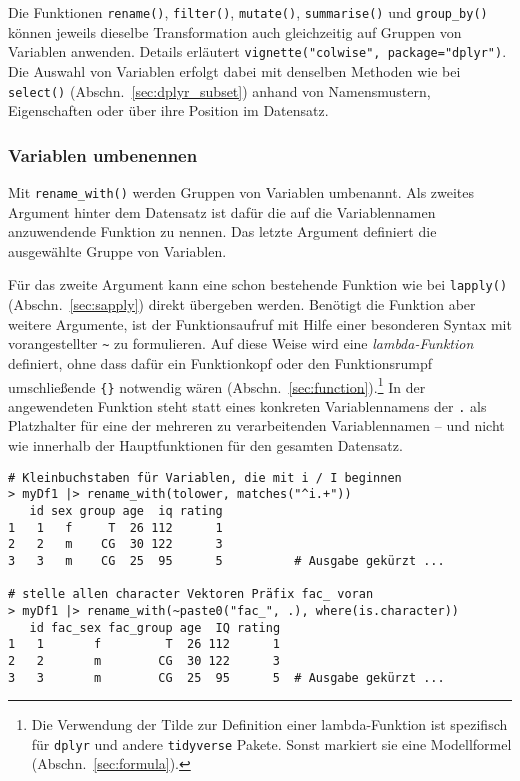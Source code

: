 Die Funktionen \lstinline!rename()!, \lstinline!filter()!, \lstinline!mutate()!, \lstinline!summarise()! und \lstinline!group_by()! können jeweils dieselbe Transformation auch gleichzeitig auf Gruppen von Variablen anwenden. Details erläutert \lstinline!vignette("colwise", package="dplyr")!. Die Auswahl von Variablen erfolgt dabei mit denselben Methoden wie bei \lstinline!select()! (Abschn.\ \ref{sec:dplyr_subset}) anhand von Namensmustern, Eigenschaften oder über ihre Position im Datensatz.

\subsubsection{Variablen umbenennen}

Mit \lstinline!rename_with()! werden Gruppen von Variablen umbenannt. Als zweites Argument hinter dem Datensatz ist dafür die auf die Variablennamen anzuwendende Funktion zu nennen. Das letzte Argument definiert die ausgewählte Gruppe von Variablen.

Für das zweite Argument kann eine schon bestehende Funktion wie bei \lstinline!lapply()! (Abschn.\ \ref{sec:sapply}) direkt übergeben werden. Benötigt die Funktion aber weitere Argumente, ist der Funktionsaufruf mit Hilfe einer besonderen Syntax mit vorangestellter \lstinline!~! zu formulieren. Auf diese Weise wird eine \emph{lambda-Funktion} definiert, ohne dass dafür ein Funktionkopf oder den Funktionsrumpf umschließende \lstinline!{}! notwendig wären (Abschn.\ \ref{sec:function}).\footnote{Die Verwendung der Tilde zur Definition einer lambda-Funktion ist spezifisch für \lstinline!dplyr! und andere \lstinline!tidyverse! Pakete. Sonst markiert sie eine Modellformel (Abschn.\ \ref{sec:formula}).} In der angewendeten Funktion steht statt eines konkreten Variablennamens der \lstinline!.! als Platzhalter für eine der mehreren zu verarbeitenden Variablennamen -- und nicht wie innerhalb der Hauptfunktionen für den gesamten Datensatz.
\begin{lstlisting}
# Kleinbuchstaben für Variablen, die mit i / I beginnen
> myDf1 |> rename_with(tolower, matches("^i.+"))
   id sex group age  iq rating
1   1   f     T  26 112      1
2   2   m    CG  30 122      3
3   3   m    CG  25  95      5          # Ausgabe gekürzt ...

# stelle allen character Vektoren Präfix fac_ voran
> myDf1 |> rename_with(~paste0("fac_", .), where(is.character))
   id fac_sex fac_group age  IQ rating
1   1       f         T  26 112      1
2   2       m        CG  30 122      3
3   3       m        CG  25  95      5  # Ausgabe gekürzt ...
\end{lstlisting}

